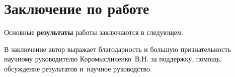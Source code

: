 \chapter*{Заключение по работе}                       %

Основные \textbf{результаты} работы заключаются в следующем.


В заключение автор выражает благодарность и большую признательность научному руководителю
Коромысличенко~В.\:Н. за поддержку, помощь, обсуждение результатов и~научное руководство.
